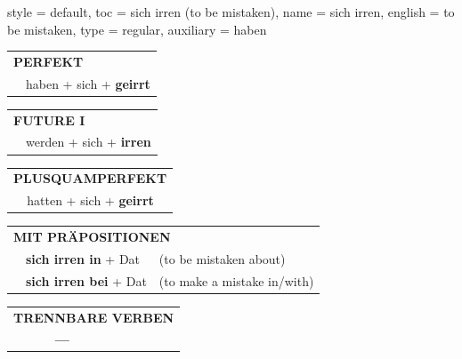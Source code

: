 \begin{verbentry}{
  style = {default},
  toc = {sich irren (to be mistaken)},
  name = {sich irren},
  english = {to be mistaken},
  type = {regular},
  auxiliary = {haben}
}
 \begin{tabular}{rl}
     \multicolumn{2}{l}{\textbf{PERFEKT}}\\
   & haben + sich + \textbf{geirrt}\\
  \end{tabular}
\hfill
   \begin{tabular}{rl}
    \multicolumn{2}{l}{\textbf{FUTURE I} }\\
   & werden + sich + \textbf{irren}\\
  \end{tabular}
\hfill
   \begin{tabular}{rl}
      \multicolumn{2}{l}{\textbf{PLUSQUAMPERFEKT}}\\
   & hatten + sich + \textbf{geirrt}\\
  \end{tabular}

   \vspace{10pt}

   \begin{tabular}{lll}
      \multicolumn{3}{l}{\textbf{MIT PRÄPOSITIONEN}}\\
& \textbf{sich irren in} + Dat & (to be mistaken about)\\
& \textbf{sich irren bei} + Dat & (to make a mistake in/with)\\
\end{tabular}
  \hfill
   \begin{tabular}{lll}
\multicolumn{3}{l}{\textbf{TRENNBARE VERBEN}}\\
& \textbf{---} & \\
\end{tabular}

  \vspace{-5pt}
\end{verbentry}

